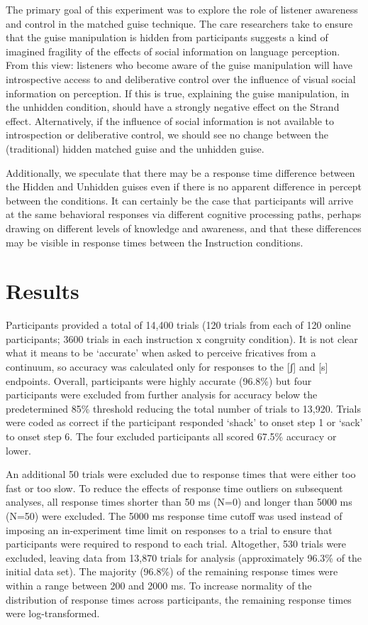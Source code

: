 \documentclass[
  letterpaper,
  DIV=11,
  numbers=noendperiod]{scrartcl}
\begin{document}
The primary goal of this experiment was to explore the role of listener
awareness and control in the matched guise technique. The care
researchers take to ensure that the guise manipulation is hidden from
participants suggests a kind of imagined fragility of the effects of
social information on language perception. From this view: listeners who
become aware of the guise manipulation will have introspective access to
and deliberative control over the influence of visual social information
on perception. If this is true, explaining the guise manipulation, in
the unhidden condition, should have a strongly negative effect on the
Strand effect. Alternatively, if the influence of social information is
not available to introspection or deliberative control, we should see no
change between the (traditional) hidden matched guise and the unhidden
guise.

Additionally, we speculate that there may be a response time difference
between the Hidden and Unhidden guises even if there is no apparent
difference in percept between the conditions. It can certainly be the
case that participants will arrive at the same behavioral responses via
different cognitive processing paths, perhaps drawing on different
levels of knowledge and awareness, and that these differences may be
visible in response times between the Instruction conditions.

\section{Results}\label{sec-results}

Participants provided a total of 14,400 trials (120 trials from each of
120 online participants; 3600 trials in each instruction x congruity
condition). It is not clear what it means to be `accurate' when asked to
perceive fricatives from a continuum, so accuracy was calculated only
for responses to the {[}ʃ{]} and {[}s{]} endpoints. Overall,
participants were highly accurate (96.8\%) but four participants were
excluded from further analysis for accuracy below the predetermined 85\%
threshold reducing the total number of trials to 13,920. Trials were
coded as correct if the participant responded `shack' to onset step 1 or
`sack' to onset step 6. The four excluded participants all scored 67.5\%
accuracy or lower.

An additional 50 trials were excluded due to response times that were
either too fast or too slow. To reduce the effects of response time
outliers on subsequent analyses, all response times shorter than 50 ms
(N=0) and longer than 5000 ms (N=50) were excluded. The 5000 ms response
time cutoff was used instead of imposing an in-experiment time limit on
responses to a trial to ensure that participants were required to
respond to each trial. Altogether, 530 trials were excluded, leaving
data from 13,870 trials for analysis (approximately 96.3\% of the
initial data set). The majority (96.8\%) of the remaining response times
were within a range between 200 and 2000 ms. To increase normality of
the distribution of response times across participants, the remaining
response times were log-transformed.
\end{document}
